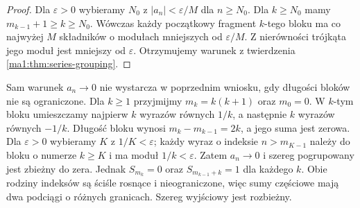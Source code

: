 \begin{proof}
Dla $\varepsilon>0$ wybieramy $N_0$ z $|a_n|<\varepsilon/M$ dla $n\ge N_0$. Dla $k\ge N_0$ mamy $m_{k-1}+1\ge k\ge N_0$. Wówczas każdy początkowy fragment $k$-tego bloku ma co najwyżej $M$ składników o modułach mniejszych od $\varepsilon/M$. Z nierówności trójkąta jego moduł jest mniejszy od $\varepsilon$. Otrzymujemy warunek z twierdzenia \ref{ma1:thm:series-grouping}.
\end{proof}

\begin{przyklad}
\label{ma1:ex:unbounded-grouping}
Sam warunek $a_n\to0$ nie wystarcza w poprzednim wniosku, gdy długości bloków nie są ograniczone. Dla $k\ge1$ przyjmijmy $m_k=k(k+1)$ oraz $m_0=0$. W $k$-tym bloku umieszczamy najpierw $k$ wyrazów równych $1/k$, a następnie $k$ wyrazów równych $-1/k$. Długość bloku wynosi $m_k-m_{k-1}=2k$, a jego suma jest zerowa. Dla $\varepsilon>0$ wybieramy $K$ z $1/K<\varepsilon$; każdy wyraz o indeksie $n>m_{K-1}$ należy do bloku o numerze $k\ge K$ i ma moduł $1/k<\varepsilon$. Zatem $a_n\to0$ i szereg pogrupowany jest zbieżny do zera. Jednak $S_{m_k}=0$ oraz $S_{m_{k-1}+k}=1$ dla każdego $k$. Obie rodziny indeksów są ściśle rosnące i nieograniczone, więc sumy częściowe mają dwa podciągi o różnych granicach. Szereg wyjściowy jest rozbieżny.
\end{przyklad}

